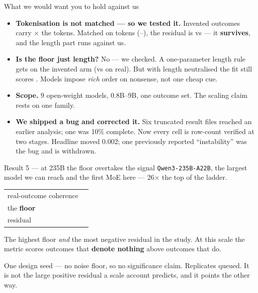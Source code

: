 \documentclass[aspectratio=169,11pt]{beamer}
\newcommand{\hl}[1]{\textcolor{accent}{\textbf{#1}}}
\begin{document}
\begin{frame}{What we would want you to hold against us}
  \begin{itemize}
    \item \textbf{Tokenisation is not matched --- so we tested it.} Invented
      outcomes carry \TokenInflation$\times$ the tokens. Matched on tokens
      (\MatchedBandLo--\MatchedBandHi), the residual is \MatchedResidual{} vs
      \MeanResidual{} --- it \hl{survives}, and the length part runs against us.
    \item \textbf{Is the floor just length?} No --- we checked. A
      one-parameter length rule gets \FloorLengthRule{} on the invented arm
      (vs \RealLengthRule{} on real). But with length neutralised the fit
      still scores \hl{\FloorTiedAcc{}}. Models impose \emph{rich} order on
      nonsense, not one cheap cue.
    \item \textbf{Scope.} 9 open-weight models, 0.8B--9B, one outcome set.
      The scaling claim rests on one family.
    \item \textbf{We shipped a bug and corrected it.} Six truncated result
      files reached an earlier analysis; one was 10\% complete. Now every cell
      is row-count verified at two stages. Headline moved 0.002; one previously
      reported ``instability'' was the bug and is withdrawn.
  \end{itemize}
\end{frame}

\begin{frame}{Result 5 --- at 235B the floor overtakes the signal}
  \texttt{Qwen3-235B-A22B}, the largest model we can reach and the first MoE
  here --- 26$\times$ the top of the ladder.

  \bigskip
  \begin{center}
  \begin{tabular}{@{}lr@{}}
    \toprule
    real-outcome coherence & \HQwenThreeTwoThreeFiveBATwoTwoBInstructTwoFiveZeroSevenR{} \\
    the \hl{floor} & \hl{\HQwenThreeTwoThreeFiveBATwoTwoBInstructTwoFiveZeroSevenN{}} \\
    \midrule
    residual & \hl{\HQwenThreeTwoThreeFiveBATwoTwoBInstructTwoFiveZeroSevenResid{}} \\
    \bottomrule
  \end{tabular}
  \end{center}

  \bigskip
  The highest floor \emph{and} the most negative residual in the study. At this
  scale the metric scores outcomes that \hl{denote nothing} above outcomes that
  do.

  \bigskip
  \small
  One design seed --- no noise floor, so no significance claim. Replicates
  queued. It is not the large positive residual a scale account predicts, and
  it points the other way.
\end{frame}
\end{document}
